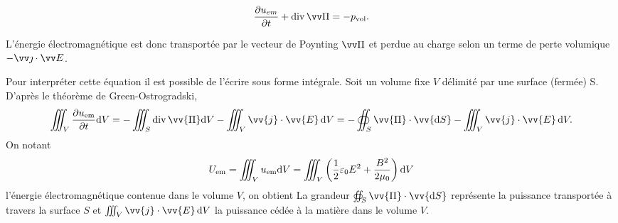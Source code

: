 \documentclass[12pt,fancy]{cours}
\begin{document}
\begin{theorem}\label{form:}
  $$
\dr{u_{em}}{t} + \dive \Poy = -p_{\rm vol}.
$$
\end{theorem}
L'énergie électromagnétique est donc transportée par le vecteur de  Poynting $\Poy$ et perdue au charge selon un terme de perte volumique $-\j \ps \E$.

Pour interpréter cette équation il est possible de l'écrire sous forme intégrale. Soit un volume fixe $V$ délimité par une surface (fermée) S. D'après le théorème de Green-Ostrogradski,
\begin{equation}
\iiint_{V}\frac{\partial u_{\rm{em}}}{\partial t}\d V=-\iiint_{S}\dive \vv{\Pi}\d V- \iiint_{V}\vv{j}\cdot\vv{E}\,\d V = -\oiint_{S}\vv{\Pi}\cdot\vv{\d S} - \iiint_{V}\vv{j}\cdot\vv{E}\,\d V.
\end{equation}
On notant
\begin{equation}
  U_{\rm em} = \iiint_{V} u_{\rm{em}}\mathrm{d} V =  \iiint_{V} \left( \frac{1}{2}\varepsilon_0 E^2+\frac{B^2}{2\mu_0} \right)\mathrm{d} V
\end{equation}
l'énergie électromagnétique contenue dans le volume $V$, on obtient
La grandeur $\oiint_{S}\vv{\Pi}\cdot\vv{\d S} $ représente la puissance transportée à travers la surface $S$ et  $\iiint_{V}\vv{j}\cdot\vv{E}\,\d V $ la puissance cédée à la matière dans le volume $V$.
\end{document}
